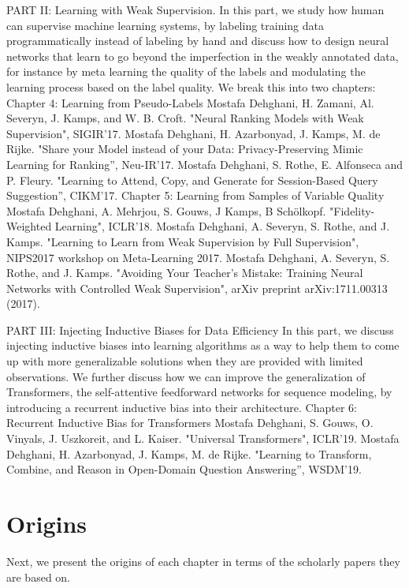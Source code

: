 PART II: Learning with Weak Supervision.
In this part, we study how human can supervise machine learning systems, by labeling training data programmatically instead of labeling by hand and discuss how to design neural networks that learn to go beyond the imperfection in the weakly annotated data, for instance by meta learning the quality of the labels and modulating the learning process based on the label quality. We break this into two chapters:
Chapter 4: Learning from Pseudo-Labels
Mostafa Dehghani, H. Zamani, Al. Severyn, J. Kamps, and W. B. Croft. "Neural Ranking Models with Weak Supervision", SIGIR'17.
Mostafa Dehghani, H. Azarbonyad, J. Kamps, M. de Rijke. "Share your Model instead of your Data: Privacy-Preserving Mimic Learning for Ranking'', Neu-IR'17.
Mostafa Dehghani, S. Rothe, E. Alfonseca and P. Fleury. "Learning to Attend, Copy, and Generate for Session-Based Query Suggestion'', CIKM'17.
Chapter 5: Learning from Samples of Variable Quality
Mostafa Dehghani, A. Mehrjou, S. Gouws, J Kamps, B Schölkopf. "Fidelity-Weighted Learning", ICLR'18.
Mostafa Dehghani, A. Severyn, S. Rothe, and J. Kamps. "Learning to Learn from Weak Supervision by Full Supervision", NIPS2017 workshop on Meta-Learning 2017.
Mostafa Dehghani, A. Severyn, S. Rothe, and J. Kamps. "Avoiding Your Teacher’s Mistake: Training Neural Networks with Controlled Weak Supervision", arXiv preprint arXiv:1711.00313 (2017). 

PART III: Injecting Inductive Biases for Data Efficiency
In this part, we discuss injecting inductive biases into learning algorithms as a way to help them to come up with more generalizable solutions when they are provided with limited observations. We further discuss how we can improve the generalization of Transformers, the self-attentive feedforward networks for sequence modeling, by introducing a recurrent inductive bias into their architecture.
Chapter 6: Recurrent Inductive Bias for Transformers
Mostafa Dehghani, S. Gouws, O. Vinyals, J. Uszkoreit, and L. Kaiser. "Universal Transformers", ICLR'19.
Mostafa Dehghani, H. Azarbonyad, J. Kamps, M. de Rijke. "Learning to Transform, Combine, and Reason in Open-Domain Question Answering'', WSDM'19.


\section{Origins}
Next, we present the origins of each chapter in terms of the scholarly papers they are
based on.

